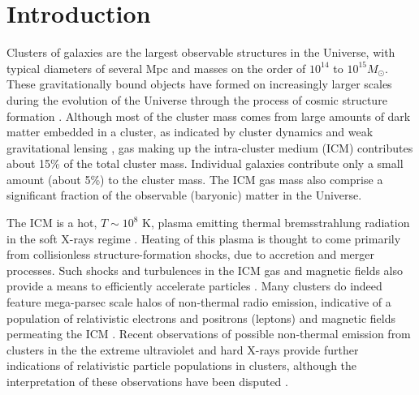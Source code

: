 \documentclass[12pt,manuscript]{aastex}
\begin{document}

\section{Introduction}
Clusters of galaxies are the largest observable structures in the Universe, with typical diameters of several Mpc and masses on the order of $10^{14}$ to $10^{15} M_{\odot}$. These gravitationally bound objects have formed on increasingly larger scales during the evolution of the Universe through the process of cosmic structure formation \citep{article:Voit:2005}. Although most of the cluster mass comes from large amounts of dark matter embedded in a cluster, as indicated by cluster dynamics and weak gravitational lensing \citep[][]{article:DiaferioSchindlerDolag:2008}, gas making up the intra-cluster medium (ICM) contributes about 15\% of the total cluster mass. Individual galaxies contribute only a small amount (about 5\%) to the cluster mass. The ICM gas mass also comprise a significant fraction of the observable (baryonic) matter in the Universe.

The ICM is a hot, $T\sim 10^{8}$ K, plasma emitting thermal bremsstrahlung radiation in the soft X-rays regime \citep[see, e.g.][]{article:Petrosian:2001}. Heating of this plasma is thought to come primarily from collisionless structure-formation shocks, due to accretion and merger processes. Such shocks and turbulences in the ICM gas and magnetic fields also provide a means to efficiently accelerate particles \citep[see, e.g.,][]{article:ColafrancescoBlasi:1998, article:Ryu_etal:2003}. Many clusters do indeed feature mega-parsec scale halos of non-thermal radio emission, indicative of a population of relativistic electrons and positrons (leptons) and magnetic fields permeating the ICM \citep{article:Cassano_etal:2010}. Recent observations of possible non-thermal emission from clusters in the the extreme ultraviolet \citep[EUV; ][]{article:SarazinLieu:1998} and hard X-rays \citep{article:RephaeliGruber:2002, article:Fusco-Femiano_etal:2004, article:Eckert_etal:2007} provide further indications of relativistic particle populations in clusters, although the interpretation of these observations have been disputed \citep[see, e.g.][]{article:Wik_etal:2009}.
\end{document}
